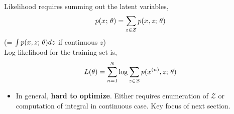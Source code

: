 \begin{frame}
Likelihood requires summing out the latent variables,
    \[p(x^{} ; \, \theta) = \sum_{z \in \mathcal{Z}} p(x^{}, z ; \, \theta) \]
    (= $\int p(x, z ; \, \theta) dz$ if continuous $z$)\\
    \vspace{3mm}
Log-likelihood for the training set is,
\[  L(\theta) =  \sum_{n=1}^N \log \sum_{z \in \mathcal{Z}} p(x^{(n)} , z ; \, \theta)  \]

\begin{itemize}
\item In general, \textbf{hard to optimize}. Either requires enumeration of $\mathcal{Z}$
or computation of integral in continuous case. Key focus of next section. 
\end{itemize}

\end{frame}





